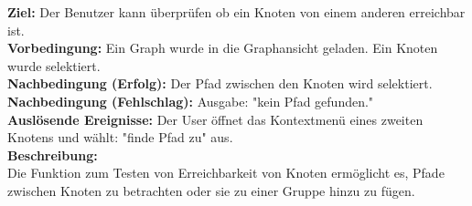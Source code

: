 \label{fa:erreichbarkeit}
\textbf{Ziel:} Der Benutzer kann überprüfen ob ein Knoten von einem anderen erreichbar ist. \\
\textbf{Vorbedingung:} Ein Graph wurde in die Graphansicht geladen. Ein Knoten wurde selektiert. \\
\textbf{Nachbedingung (Erfolg):} Der Pfad zwischen den Knoten wird selektiert. \\
\textbf{Nachbedingung (Fehlschlag):} Ausgabe: "kein Pfad gefunden." \\
\textbf{Auslösende Ereignisse:} Der User öffnet das Kontextmenü eines zweiten Knotens und wählt: "finde Pfad zu" aus.\\
\textbf{Beschreibung:}\\
Die Funktion zum Testen von Erreichbarkeit von Knoten ermöglicht es, Pfade zwischen Knoten zu betrachten oder sie zu einer Gruppe hinzu zu fügen.\\

%
